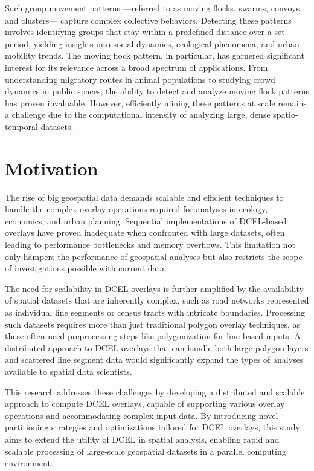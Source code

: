 Such group movement patterns —referred to as moving flocks, swarms, convoys, and clusters— capture complex collective behaviors. Detecting these patterns 
involves identifying groups that stay within a predefined distance over a set period, yielding insights into social dynamics, ecological phenomena, and urban 
mobility trends. The moving flock pattern, in particular, has garnered significant interest for its relevance across a broad spectrum of applications. From 
understanding migratory routes in animal populations to studying crowd dynamics in public spaces, the ability to detect and analyze moving flock patterns has 
proven invaluable. However, efficiently mining these patterns at scale remains a challenge due to the computational intensity of analyzing large, dense 
spatio-temporal datasets.

\section{Motivation}
The rise of big geospatial data demands scalable and efficient techniques to handle the complex overlay operations required for analyses in ecology, economics, 
and urban planning. Sequential implementations of DCEL-based overlays have proved inadequate when confronted with large datasets, often leading to performance 
bottlenecks and memory overflows. This limitation not only hampers the performance of geospatial analyses but also restricts the scope of investigations 
possible with current data.

The need for scalability in DCEL overlays is further amplified by the availability of spatial datasets that are inherently complex, such as road networks 
represented as individual line segments or census tracts with intricate boundaries. Processing such datasets requires more than just traditional polygon overlay 
techniques, as these often need preprocessing steps like polygonization for line-based inputs. A distributed approach to DCEL overlays that can handle both 
large polygon layers and scattered line segment data would significantly expand the types of analyses available to spatial data scientists.

This research addresses these challenges by developing a distributed and scalable approach to compute DCEL overlays, capable of supporting various overlay 
operations and accommodating complex input data. By introducing novel partitioning strategies and optimizations tailored for DCEL overlays, this study aims to 
extend the utility of DCEL in spatial analysis, enabling rapid and scalable processing of large-scale geospatial datasets in a parallel computing environment.

